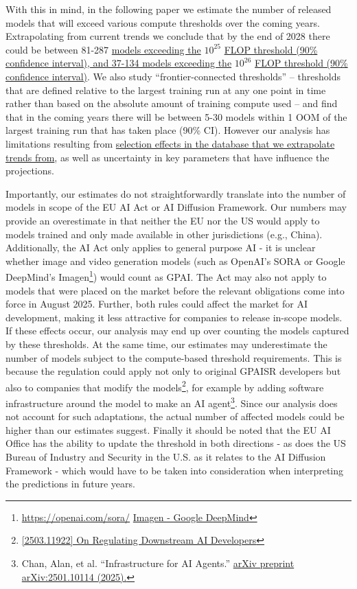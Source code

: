 \documentclass[11pt]{article}
\begin{document}
With this in mind, in the following paper we estimate the number of released models that will exceed various compute thresholds over the coming years. Extrapolating from current trends we conclude that by the end of 2028 there could be between 81-287 \hyperref[results]{models exceeding the} $10^{25}$ \hyperref[results]{FLOP threshold (90\% confidence interval), and 37-134 models exceeding the} $10^{26}$ \hyperref[results]{FLOP threshold (90\% confidence interval)}. We also study ``frontier-connected thresholds'' -- thresholds that are defined relative to the largest training run at any one point in time rather than based on the absolute amount of training compute used -- and find that in the coming years there will be between 5-30 models within 1 OOM of the largest training run that has taken place (90\% CI). However our analysis has limitations resulting from \hyperref[notable-models-selection-effect]{selection effects in the database that we extrapolate trends from}, as well as uncertainty in key parameters that have influence the projections.

Importantly, our estimates do not straightforwardly translate into the number of models in scope of the EU AI Act or AI Diffusion Framework. Our numbers may provide an overestimate in that neither the EU nor the US would apply to models trained and only made available in other jurisdictions (e.g., China). Additionally, the AI Act only applies to general purpose AI - it is unclear whether image and video generation models (such as OpenAI's SORA or Google DeepMind's Imagen\footnote{\href{https://openai.com/sora/}{https://openai.com/sora/} \href{https://deepmind.google/technologies/imagen-3/}{Imagen - Google DeepMind}}) would count as GPAI. The Act may also not apply to models that were placed on the market before the relevant obligations come into force in August 2025. Further, both rules could affect the market for AI development, making it less attractive for companies to release in-scope models. If these effects occur, our analysis may end up over counting the models captured by these thresholds. At the same time, our estimates may underestimate the number of models subject to the compute-based threshold requirements. This is because the regulation could apply not only to original GPAISR developers but also to companies that modify the models\footnote{\href{https://arxiv.org/abs/2503.11922}{[2503.11922] On Regulating Downstream AI Developers}}, for example by adding software infrastructure around the model to make an AI agent\footnote{Chan, Alan, et al. ``Infrastructure for AI Agents.'' \href{https://arxiv.org/abs/2501.10114}{arXiv preprint arXiv:2501.10114 (2025).}}. Since our analysis does not account for such adaptations, the actual number of affected models could be higher than our estimates suggest. Finally it should be noted that the EU AI Office has the ability to update the threshold in both directions - as does the US Bureau of Industry and Security in the U.S. as it relates to the AI Diffusion Framework - which would have to be taken into consideration when interpreting the predictions in future years.
\end{document}
